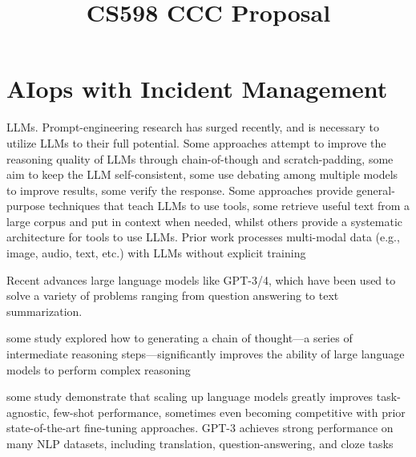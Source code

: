 \documentclass[conference]{IEEEtran}
\begin{document}
\title{CS598 CCC Proposal\\
}

\author{
\and
{}
\and
{}
}
\maketitle


\section{AIops with Incident Management}

LLMs. Prompt-engineering research has surged recently, and is necessary to utilize LLMs to their full potential. Some approaches attempt to improve the reasoning quality of LLMs through chain-of-though and scratch-padding, some aim to keep the LLM self-consistent, some use debating among multiple models to improve results, some verify the response. Some approaches provide general-purpose techniques that teach LLMs to use tools, some retrieve useful text from a large corpus and put in context when needed, whilst others provide a systematic architecture for tools to use LLMs. Prior work processes multi-modal data (e.g., image, audio, text, etc.) with LLMs without explicit training\cite{hamadanian2023a} 

Recent advances large language models like GPT-3/4, which have been used to solve a variety of problems ranging from question answering to text summarization. 

some study explored how to generating a chain of thought---a series of intermediate reasoning steps---significantly improves the ability of large language models to perform complex reasoning\cite{wei2022chain}

some study demonstrate that scaling up language models greatly improves task-agnostic, few-shot performance, sometimes even becoming competitive with prior state-of-the-art fine-tuning approaches. GPT-3 achieves strong performance on many NLP datasets, including translation, question-answering, and cloze tasks\cite{brown2020language}
\end{document}
